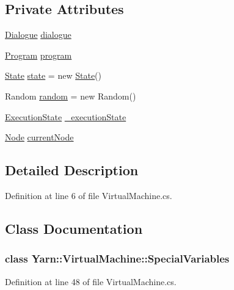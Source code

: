 \subsection*{Private Attributes}
\begin{DoxyCompactItemize}
\item 
\hyperlink{a00082}{Dialogue} \hyperlink{a00152_ac506426c503da5f033247c29e11c5e82}{dialogue}
\item 
\hyperlink{a00142}{Program} \hyperlink{a00152_a2695dbfe3d9df7ffa3f13ad2231217fb}{program}
\item 
\hyperlink{a00155}{State} \hyperlink{a00152_a70f2ce6201cdd2430ceaa764ac614ca0}{state} = new \hyperlink{a00155}{State}()
\item 
Random \hyperlink{a00152_a408485a00c7cc558428c86ed9dd04fca}{random} = new Random()
\item 
\hyperlink{a00152_add28fa9c8a45ca579e84d05920bbc42d}{Execution\-State} \hyperlink{a00152_a0ae362616d85f028b7ec3230388926f4}{\-\_\-execution\-State}
\item 
\hyperlink{a00041_a00361}{Node} \hyperlink{a00152_ab7594e14981ad75cecea3b2e7dcf895c}{current\-Node}
\end{DoxyCompactItemize}


\subsection{Detailed Description}


Definition at line 6 of file Virtual\-Machine.\-cs.



\subsection{Class Documentation}
\label{a00363}
\hypertarget{a00152_a00363}{}
\subsubsection{class Yarn\-:\-:Virtual\-Machine\-:\-:Special\-Variables}


Definition at line 48 of file Virtual\-Machine.\-cs.



